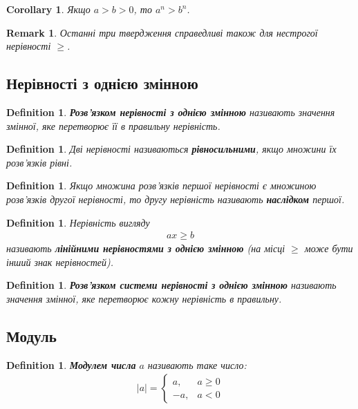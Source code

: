\documentclass[a4paper, 10pt]{article}
\theoremstyle{theoremdd}
\theoremstyle{theoremdd}
\newtheorem{definition}[theorem]{Definition}
\theoremstyle{theoremdd}
\theoremstyle{theoremdd}
\theoremstyle{theoremdd}
\theoremstyle{theoremdd}
\newtheorem{remark}[theorem]{Remark}
\theoremstyle{theoremdd}
\theoremstyle{theoremdd}
\newtheorem{corollary}[theorem]{Corollary}
\begin{document}
\begin{corollary}
Якщо $a>b>0$, то $a^n > b^n$.
\end{corollary}

\begin{remark}
Останні три твердження справедливі також для нестрогої нерівності $\geq$.
\end{remark}

\subsection{Нерівності з однією змінною}
\begin{definition}
\textbf{Розв'язком нерівності з однією змінною} називають значення змінної, яке перетворює її в правильну нерівність.
\end{definition}

\begin{definition}
Дві нерівності називаються \textbf{рівносильними}, якщо множини їх розв'язків рівні.
\end{definition}

\begin{definition}
Якщо множина розв'язків першої нерівності є множиною розв'язків другої нерівності, то другу нерівність називають \textbf{наслідком} першої.
\end{definition}

\begin{definition}
Нерівність вигляду
\begin{align*}
ax \geq b
\end{align*}
називають \textbf{лінійними нерівностями з однією змінною} (на місці $\geq$ може бути інший знак нерівностей).
\end{definition}

\begin{definition}
\textbf{Розв'язком системи нерівності з однією змінною} називають значення змінної, яке перетворює кожну нерівність в правильну.
\end{definition}

\subsection{Модуль}
\begin{definition}
\textbf{Модулем числа} $a$ називають таке число:
\begin{align*}
|a| = \begin{cases} a, & a \geq 0 \\ -a, & a < 0 \end{cases}
\end{align*}
\end{definition}
\end{document}
